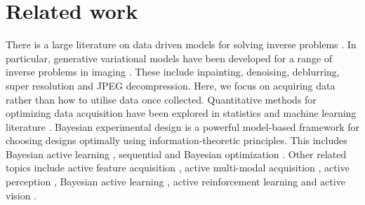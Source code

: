 \section{Related work}
There is a large literature on data driven models for solving inverse problems \citep{Arridge_Maass_Oktem_Schonlieb_2019}.
In particular, generative variational models have been developed for a range of inverse problems in imaging \citep{doi:10.1137/21M1414978}. These include inpainting, denoising, deblurring, super resolution and JPEG decompression. Here, we focus on acquiring data rather than how to utilise data once collected. 
Quantitative methods for optimizing data acquisition have been explored in statistics and machine learning literature \citep{10.1214/23-STS915}. Bayesian experimental design is a powerful model-based framework for choosing designs optimally using information-theoretic principles. This includes Bayesian active learning \citep{10.1162/neco.1992.4.4.590}, sequential \citep{pmlr-v139-foster21a} and Bayesian optimization \citep{Mockus_1989, garnett_bayesoptbook_2023}. Other related topics include active feature acquisition \citep{Saar_Tsechansky_2009}, active multi-modal acquisition \citep{kossen2023active}, active perception \citep{Bajcsy_2018}, Bayesian active learning \citep{Mackay_1992}, active reinforcement learning \citep{Andreopoulos_2013} and active vision \citep{Whitehead_1990}.

